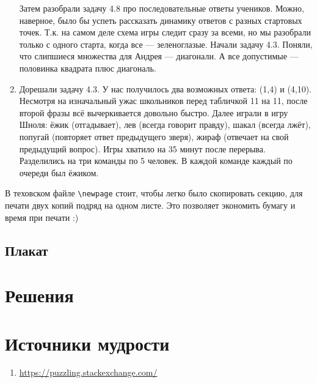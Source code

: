 \documentclass[12pt]{article}
\newcounter{problem}[section]
\theoremstyle{definition}
\begin{document}
\begin{enumerate}
  Затем разобрали задачу 4.8 про последовательные ответы учеников. Можно, наверное, было бы успеть рассказать динамику ответов с разных стартовых точек.
  Т.к. на самом деле схема игры следит сразу за всеми, но мы разобрали только с одного старта, когда все — зеленоглазые.
  Начали задачу 4.3. Поняли, что слипшиеся множества для Андрея — диагонали. А все допустимые — половинка квадрата плюс диагональ. 
  \item Дорешали задачу 4.3. У нас получилось два возможных ответа: (1,4) и (4,10). Несмотря на изначальный ужас школьников перед табличкой 11 на 11,
  после второй фразы всё вычеркивается довольно быстро. Далее играли в игру Шноля: ёжик (отгадывает), лев (всегда говорит правду),
  шакал (всегда лжёт), попугай (повторяет ответ предыдущего зверя), жираф (отвечает на свой предыдущий вопрос). Игры хватило на 35 минут после перерыва.
  Разделились на три команды по 5 человек. В каждой команде каждый по очереди был ёжиком. 
\end{enumerate}

В теховском файле \verb|\newpage| стоит, чтобы легко было скопировать секцию, для печати двух копий подряд на одном листе.
Это позволяет экономить бумагу и время при печати :)

\subsection{Плакат}






\renewenvironment{solution}[1]{%
         \vskip .5cm plus 2cm minus 0.1cm%
         {\bfseries \hyperlink{problem:#1}{#1.}}%
}%
{%
}%



\section{Решения}



\section{Источники мудрости}


\begin{enumerate}
\item \url{https://puzzling.stackexchange.com/}
\end{enumerate}

\printbibliography[heading=none]
\end{document}
